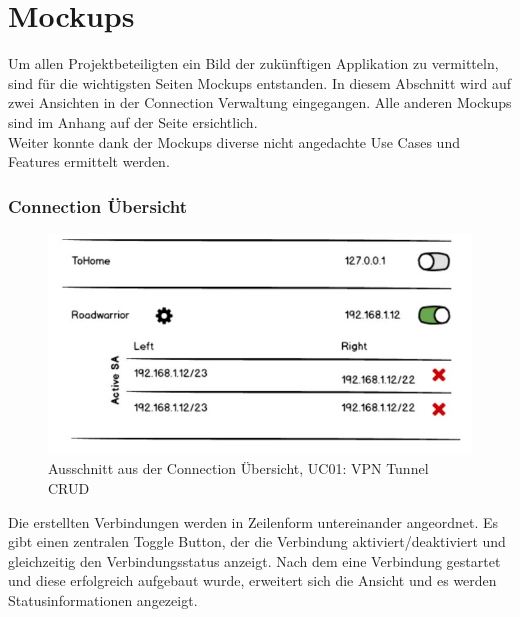 \section{Mockups}
Um allen Projektbeteiligten ein Bild der zukünftigen Applikation zu vermitteln, sind für die wichtigsten Seiten Mockups entstanden. In diesem Abschnitt wird auf zwei Ansichten in der Connection Verwaltung eingegangen. Alle anderen Mockups sind im Anhang auf der Seite \pageref{Mockups} ersichtlich.\\
Weiter konnte dank der Mockups diverse nicht angedachte Use Cases und Features ermittelt werden.
\subsubsection{Connection Übersicht}
\begin{figure}[H]
	\centering
	\includegraphics[width=330pt]{images/mockups/short_con_overview.jpg}
	\caption{Ausschnitt aus der Connection Übersicht,  UC01: VPN Tunnel CRUD}
\end{figure}
\medskip
Die erstellten Verbindungen werden in Zeilenform untereinander angeordnet. Es gibt einen zentralen Toggle Button, der die Verbindung aktiviert/deaktiviert und gleichzeitig den Verbindungsstatus anzeigt. 
Nach dem eine Verbindung gestartet und diese erfolgreich aufgebaut wurde, erweitert sich die Ansicht und es werden Statusinformationen angezeigt.

